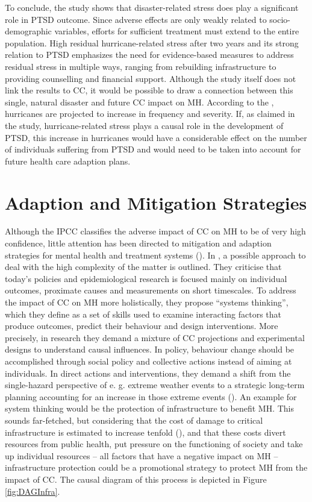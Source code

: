 \documentclass[
]{krantz}
\begin{document}
To conclude, the study shows that disaster-related stress does play a significant role in PTSD outcome. Since adverse effects are only weakly related to socio-demographic variables, efforts for sufficient treatment must extend to the entire population. High residual hurricane-related stress after two years and its strong relation to PTSD emphasizes the need for evidence-based measures to address residual stress in multiple ways, ranging from rebuilding infrastructure to providing counselling and financial support.
Although the study itself does not link the results to CC, it would be possible to draw a connection between this single, natural disaster and future CC impact on MH. According to the \citet{intergovernmentalpanelonclimatechange2023}, hurricanes are projected to increase in frequency and severity. If, as claimed in the study, hurricane-related stress plays a causal role in the development of PTSD, this increase in hurricanes would have a considerable effect on the number of individuals suffering from PTSD and would need to be taken into account for future health care adaption plans.

\section{Adaption and Mitigation Strategies}\label{adaption-and-mitigation-strategies}

Although the IPCC classifies the adverse impact of CC on MH to be of very high confidence, little attention has been directed to mitigation and adaption strategies for mental health and treatment systems (\citet{charlson2021}). In \citet{berry2018}, a possible approach to deal with the high complexity of the matter is outlined. They criticise that today's policies and epidemiological research is focused mainly on individual outcomes, proximate causes and measurements on short timescales. To address the impact of CC on MH more holistically, they propose ``systems thinking'', which they define as a set of skills used to examine interacting factors that produce outcomes, predict their behaviour and design interventions. More precisely, in research they demand a mixture of CC projections and experimental designs to understand causal influences. In policy, behaviour change should be accomplished through social policy and collective actions instead of aiming at individuals. In direct actions and interventions, they demand a shift from the single-hazard perspective of e. g. extreme weather events to a strategic long-term planning accounting for an increase in those extreme events (\citet{berry2018}).
An example for system thinking would be the protection of infrastructure to benefit MH. This sounds far-fetched, but considering that the cost of damage to critical infrastructure is estimated to increase tenfold (\citet{forzieri2018}), and that these costs divert resources from public health, put pressure on the functioning of society and take up individual resources -- all factors that have a negative impact on MH -- infrastructure protection could be a promotional strategy to protect MH from the impact of CC. The causal diagram of this process is depicted in Figure \ref{fig:DAGInfra}.
\end{document}

